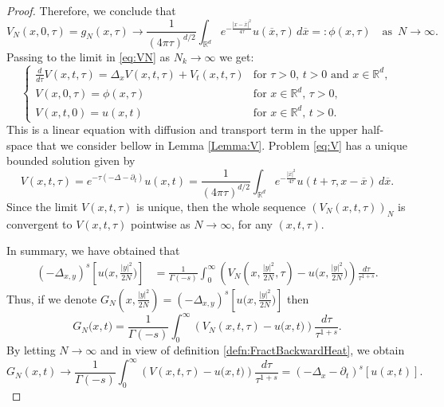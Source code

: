 \documentclass[11pt, twoside, notitlepage]{amsart}
\newcommand\R{\mathbb{R}}
\numberwithin{equation}{section}
\begin{document}
\begin{proof}
%
%
Therefore, we conclude  that
$$ V_{N}(x,0,\tau) =g_{N}(x,\tau) \rightarrow \frac{     1    }{ (4 \pi \tau)^{d/2}  }  \int_{\R^d}  e^{ - \frac{|x-\overline{x}|^2 }{4 \tau} }  u(\overline{x}, \tau ) \, d \overline{x} =: \phi(x,\tau) \quad \text{as } \, N\to \infty .$$
Passing to the limit in \eqref{eq:VN} as $N_k \to  \infty$ we get:
\begin{equation}\label{eq:V}
  \left\{ \begin{array}{ll}
  \frac{d}{d\tau}V(x,t,\tau)=\Delta_{x} V(x,t,\tau) +  V_t(x,t,\tau) &\text{for }\tau>0,\, t >0 \text{ and } x \in \R^d,  \\[2mm]
  V(x,0,\tau)=\phi(x,\tau) &\text{for } x \in \R^d, \, \tau>0, \\[1mm]
  V(x,t,0)=u(x,t) &\text{for } x \in \R^d, \, t>0.
    \end{array}
    \right.
\end{equation}
This is a linear equation with  diffusion and transport term in the upper half-space that we consider bellow in Lemma \ref{Lemma:V}. Problem \eqref{eq:V} has a unique bounded solution given by
$$ V(x,t,\tau)=e^{-\tau (-\Delta -\partial_t)}u(x,t)=\frac{1}{(4\pi\tau)^{d/2}}  \int_{\R^d} e^{-\frac{|\overline{x}|^2}{4\tau}} u(t+\tau, x- \overline{x}) \, d \overline{x}.$$
Since the limit $ V(x,t,\tau)$ is unique,  then the whole sequence $(V_N(x,t,\tau))_N$ is convergent  to $V(x,t,\tau)$ pointwise as $N\to \infty$, for any $(x,t,\tau)$.





In summary, we have obtained that
\begin{align*}%
  (-\Delta_{x,y})^s \left[ u\big(x,\frac{|y|^2}{2N}\big)  \right] &= \frac{1}{\Gamma(-s)} \int_0^ \infty \left( V_N(x,\frac{|y|^2}{2N} ,\tau) - u\big(x,\frac{|y|^2}{2N}\big)  \right) \frac{d\tau}{\tau^ {1+s}}.
    \end{align*}
Thus,  if we denote $G_N(x, \frac{|y|^2}{2N}  )= (-\Delta_{x,y})^s \left[ u\big(x,\frac{|y|^2}{2N}\big)  \right] $
 then
 $$G_N \big(x,t\big) =  \frac{1}{\Gamma(-s)} \int_0^ \infty \left( V_N (x,t ,\tau) - u\big(x,t\big)  \right) \frac{d\tau}{\tau^ {1+s}}.$$
By letting $N\to \infty$ and in view of definition \ref{defn:FractBackwardHeat}, we obtain
$$G_{N} (x,t) \rightarrow \frac{1}{\Gamma(-s)} \int_0^ \infty \left( V (x,t ,\tau) - u\big(x,t\big)  \right) \frac{d\tau}{\tau^ {1+s}}
=  ( -\Delta_x-\partial_t)^{s} [u(x,t)]. $$


\end{proof}
\end{document}
